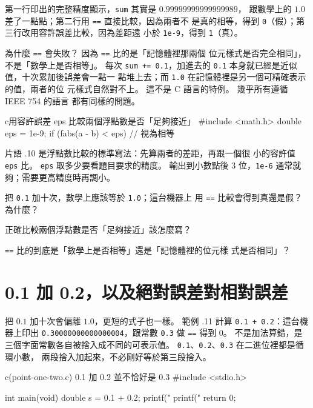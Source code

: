 第一行印出的完整精度顯示，\texttt{sum} 其實是 $0.99999999999999989$，
跟數學上的 $1.0$ 差了一點點；第二行用 \texttt{==} 直接比較，因為兩者不
是真的相等，得到 \texttt{0}（假）；第三行改用容許誤差比較，因為差距遠
小於 \texttt{1e-9}，得到 \texttt{1}（真）。

為什麼 \texttt{==} 會失敗？ 因為 \texttt{==} 比的是「記憶體裡那兩個
位元樣式是否完全相同」，不是「數學上是否相等」。 每次 \texttt{sum +=
0.1}，加進去的 \texttt{0.1} 本身就已經是近似值，十次累加後誤差會一點一
點堆上去；而 \texttt{1.0} 在記憶體裡是另一個可精確表示的值，兩者的位
元樣式自然對不上。 這不是 C 語言的特例。 幾乎所有遵循 IEEE 754 的語言
都有同樣的問題。

\begin{code}{c}{用容許誤差 eps 比較兩個浮點數是否「足夠接近」}
#include <math.h>
double eps = 1e-9;
if (fabs(a - b) < eps) {
    // 視為相等
}
\end{code}

片語 \thechapter.10 是浮點數比較的標準寫法：先算兩者的差距，再跟一個很
小的容許值 \texttt{eps} 比。 \texttt{eps} 取多少要看題目要求的精度。 
輸出到小數點後 $3$ 位，\texttt{1e-6} 通常就夠；需要更高精度時再調小。

\begin{drills}[label=drills:float-no-equality]
\item 把 \texttt{0.1} 加十次，數學上應該等於 \texttt{1.0}；這台機器上
用 \texttt{==} 比較會得到真還是假？ 為什麼？
\item 正確比較兩個浮點數是否「足夠接近」該怎麼寫？
\item \texttt{==} 比的到底是「數學上是否相等」還是「記憶體裡的位元樣
式是否相同」？
\end{drills}

\section{0.1 加 0.2，以及絕對誤差對相對誤差}
\label{sec:float-abs-rel-error}

把 $0.1$ 加十次會偏離 $1.0$，更短的式子也一樣。 範例
\thechapter.11 計算 \texttt{0.1 + 0.2}：這台機器上印出
\texttt{0.30000000000000004}，跟常數 \texttt{0.3} 做 \texttt{==} 得到
$0$。 不是加法算錯，是三個字面常數各自被捨入成不同的可表示值。 
\texttt{0.1}、\texttt{0.2}、\texttt{0.3} 在二進位裡都是循環小數，
兩段捨入加起來，不必剛好等於第三段捨入。

\begin{example}{c}{(point-one-two.c) 0.1 加 0.2 並不恰好是 0.3}
#include <stdio.h>

int main(void) {
    double s = 0.1 + 0.2;
    printf("%
    printf("%
    return 0;
}
\end{example}

